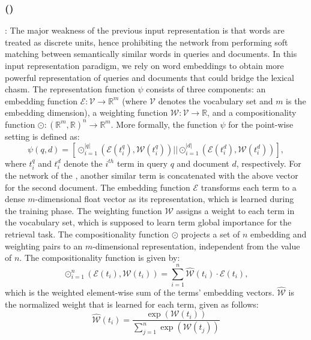 \subsubsection{\label{sec:feedthree}\Feedthree (\fthree)}:
The major weakness of the previous input representation is that words are treated as discrete units, hence prohibiting the network from  performing soft matching between semantically similar words in queries and documents. In this input representation paradigm, we rely on word embeddings to obtain more powerful representation of queries and documents that could bridge the lexical chasm. %
The representation function $\psi$ consists of three components: an embedding function $\mathcal{E}: \mathcal{V} \rightarrow \mathbb{R}^{m}$ (where $\mathcal{V}$ denotes the vocabulary set and $m$ is the embedding dimension), a weighting function $\mathcal{W}: \mathcal{V} \rightarrow \mathbb{R}$, and a compositionality function $\odot: (\mathbb{R}^{m}, \mathbb{R})^n \rightarrow \mathbb{R}^{m}$. More formally, the function $\psi$ for the point-wise setting is defined as:
\begin{equation}
\psi(q, d) = [\odot_{i=1}^{|q|}(\mathcal{E}(t_i^q), \mathcal{W}(t_i^q)) || \odot_{i=1}^{|d|} (\mathcal{E}(t_i^d), \mathcal{W}(t_i^d))],
\end{equation}
where $t_i^q$ and $t_i^d$ denote the $i^{th}$ term in query $q$ and document $d$, respectively. 
For the network of the \modelthree, another similar term is concatenated with the above vector for the second document. The embedding function $\mathcal{E}$ transforms each term to a dense $m$-\:dimensional float vector as its representation, which is learned during the training phase. The weighting function $\mathcal{W}$ assigns a weight to each term in the vocabulary set, which is supposed to learn term global importance for the retrieval task. The compositionality function $\odot$ projects a set of $n$ embedding and weighting pairs to an $m$-\:dimensional representation, independent from the value of $n$. The compositionality function is given by:
\begin{equation}
\odot_{i=1}^n(\mathcal{E}(t_i), \mathcal{W}(t_i)) = \sum_{i=1}^n \widehat{\mathcal{W}}(t_i)\cdot \mathcal{E}(t_i),
\end{equation}
which is the weighted element-wise sum of the terms' embedding vectors. $\widehat{\mathcal{W}}$ is the normalized weight that is learned for each term, given as follows:
\begin{equation}
\widehat{\mathcal{W}}(t_i) = \frac{\exp(\mathcal{W}(t_i))}{\sum_{j=1}^n{ \exp(\mathcal{W}(t_j))}}
\end{equation}

